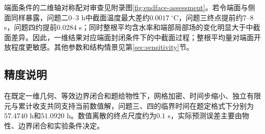 端面条件的二维轴对称配对审查见附录图\ref{fig:endface-assessment}。若令端面与侧面同样暴露，问题二0--3 h中截面温度最大差约$0.0017\ ^\circ\mathrm C$，问题三终点提前约7--8 s，问题四约提前$0.0284$ s；同时整根平均含水率和端部局部场的变化明显大于中截面差异。因此，一维结果对应端面封闭条件下的中截面过程；整根平均量对端面开放程度更敏感。其他参数和结构情景见第\ref{sec:sensitivity}节。

\subsection{精度说明}

在既定一维几何、等效边界闭合和题给物性下，网格加密、时间步缩小、独立有限元与累计收支共同支持当前数值解，问题三、四的临界时间在题定格式下分别为$57.4740$ h和$51.0920$ h。数值离散的终点尺度约为$0.1$ s，实际预测误差主要由物性、边界闭合和实验条件决定。
